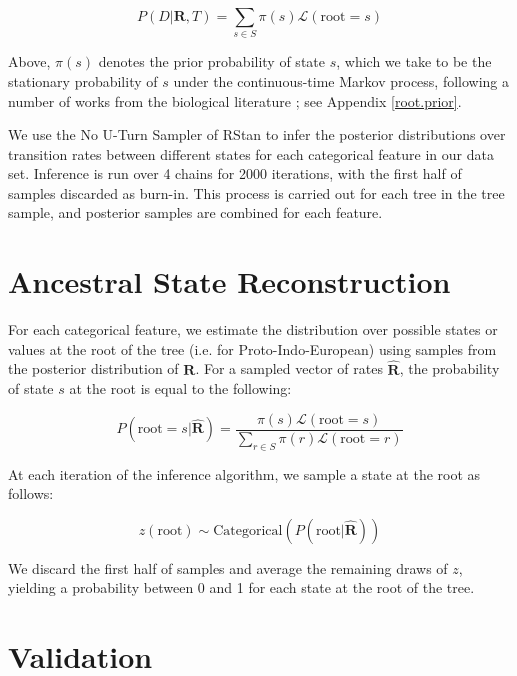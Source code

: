 \documentclass[12pt]{article}
\begin{document}
\begin{appendices}
$$
P(D|\mathbf{R},T) = \sum_{s \in S} \pi(s) \mathcal{L}(\text{root}=s)
$$

Above, $\pi(s)$ denotes the prior probability of state $s$, which we take to be the stationary probability of $s$ under the continuous-time Markov process, following a number of works from the biological literature \citep{Huelsenbeck2003,Nielsen2002,Felsenstein2004}; 
see Appendix \ref{root.prior}. 

We use the No U-Turn Sampler of RStan \citep{Carpenteretal2017}  to infer the posterior distributions over transition rates between different states for each categorical feature in our data set. Inference is run over 4 chains for 2000 iterations, with the first half of samples discarded as burn-in. This process is carried out for each tree in the tree sample, and posterior samples are combined for each feature.

\section{Ancestral State Reconstruction}

For each categorical feature, we estimate the distribution over possible states or values at the root of the tree (i.e. for Proto-Indo-European) using samples from the posterior distribution of $\mathbf{R}$. For a sampled vector of rates $\hat{\mathbf{R}}$, the probability of state $s$ at the root is equal to the following:

$$
P(\text{root}=s|\hat{\mathbf{R}}) = \frac{\pi(s)\mathcal{L}(\text{root}=s)}{\sum_{r \in S} \pi(r)\mathcal{L}(\text{root}=r)}
$$

At each iteration of the inference algorithm, we sample a state at the root as follows:

$$
z(\text{root}) \sim \text{Categorical}(P(\text{root}|\hat{\mathbf{R}}))
$$

We discard the first half of samples and average the remaining draws of $z$, yielding a probability between 0 and 1 for each state at the root of the tree.

\section{Validation}
\label{validation}


\end{appendices}
\end{document}
